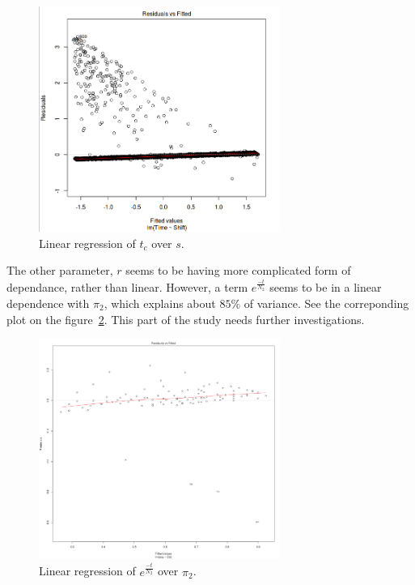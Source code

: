 \documentclass[a4paper]{article}
\begin{document}
\begin{figure} [h]
\centering
\includegraphics[width=0.7\textwidth]{figure_lm_time.png}
\caption{Linear regression of $t_c$ over $s$.}
\label{fig:lm_time}
\end{figure}

The other parameter, $r$ seems to be having more complicated form of dependance, rather than linear.
However, a term $e^{\frac{-t}{N_2}}$ seems to be in a linear dependence with $\pi_2$, which explains
about $85\%$ of variance. See the correponding plot on the figure~\ref{fig:lm_exp}. This part of the
study needs further investigations.

\begin{figure} [h]
\centering
\includegraphics[width=0.7\textwidth]{figure_lm_exp.png}
\caption{Linear regression of $e^{\frac{-t}{N_2}}$ over $\pi_2$.}
\label{fig:lm_exp}
\end{figure}
\end{document}

